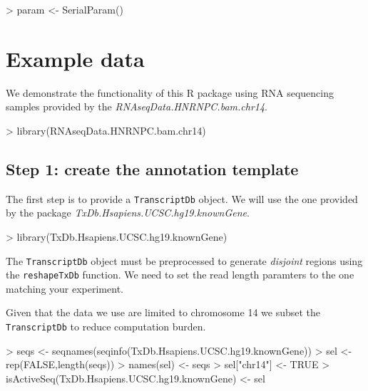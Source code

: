 \documentclass[10pt]{article}
\newcommand{\Rfunction}[1]{{\texttt{#1}}}
\newcommand{\Robject}[1]{{\texttt{#1}}}
\newcommand{\Rpackage}[1]{{\textit{#1}}}
\begin{document}
\begin{Schunk}
\begin{Sinput}
> param <- SerialParam()
\end{Sinput}
\end{Schunk}


\section{Example data}
\label{sec:example}

We demonstrate the functionality of this R package using RNA sequencing samples
provided by the
\Rpackage{RNAseqData.HNRNPC.bam.chr14}.
\begin{Schunk}
\begin{Sinput}
> library(RNAseqData.HNRNPC.bam.chr14)
\end{Sinput}
\end{Schunk}

\subsection{Step 1: create the annotation template}
\label{sec:txdb}

The first step is to provide a \Robject{TranscriptDb} object. We will use the
one provided by the package \Rpackage{TxDb.Hsapiens.UCSC.hg19.knownGene}.

\begin{Schunk}
\begin{Sinput}
> library(TxDb.Hsapiens.UCSC.hg19.knownGene)
\end{Sinput}
\end{Schunk}

The \Robject{TranscriptDb} object must be preprocessed to generate
\textit{disjoint} regions using the \Rfunction{reshapeTxDb} function. We need to
set the read length paramters to the one matching your experiment.

Given that the data we use are limited to chromosome 14 we subset the
\Robject{TranscriptDb} to reduce computation burden.

\begin{Schunk}
\begin{Sinput}
> seqs <- seqnames(seqinfo(TxDb.Hsapiens.UCSC.hg19.knownGene))
> sel <- rep(FALSE,length(seqs))
> names(sel) <- seqs
> sel["chr14"] <- TRUE
> isActiveSeq(TxDb.Hsapiens.UCSC.hg19.knownGene) <- sel
\end{Sinput}
\end{Schunk}
\end{document}
